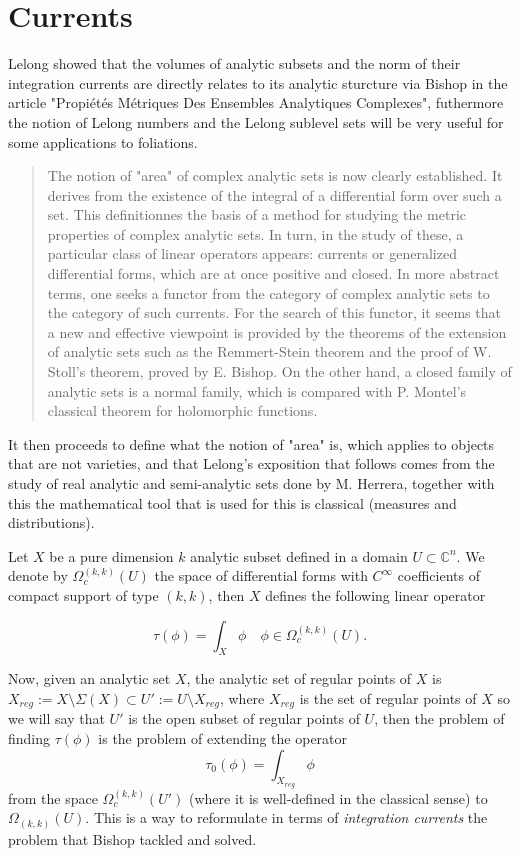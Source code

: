 \documentclass[12pt,twoside,a4paper]{report}
\newcommand{\om}{\ensuremath{\Omega}}
\newcommand{\sig}{\ensuremath{\Sigma}}
\begin{document}
\chapter{Currents}
\pagestyle{fancy}
\fancyhf{}
\fancyhead[LE]{\rightmark}
\fancyhead[RO]{\leftmark}
\fancyfoot[C]{\thepage}
\noindent Lelong showed that the volumes of analytic subsets and the norm of their integration currents are directly relates to its analytic sturcture via Bishop in the article "Propiétés Métriques Des Ensembles Analytiques Complexes", futhermore the notion of Lelong numbers and the Lelong sublevel sets will be very useful for some applications to foliations.
\begin{quote}
The notion of "area" of complex analytic sets is now clearly established. It derives from the existence of the integral of a differential form over such a set. This definitionnes the basis of a method for studying the metric properties of complex analytic sets. In turn, in the study of these, a particular class of linear operators appears: currents or generalized differential forms, which are at once positive and closed. In more abstract terms, one seeks a functor from the category of complex analytic sets to the category of such currents. For the search of this functor, it seems that a new and effective viewpoint is provided by the theorems of the extension of analytic sets such as the Remmert-Stein theorem and the proof of W. Stoll's theorem, proved by E. Bishop. On the other hand, a closed family of analytic sets is a normal family, which is compared with P. Montel's classical theorem for holomorphic functions.
\end{quote}

\noindent It then proceeds to define what the notion of "area" is, which applies to objects that are not varieties, and that Lelong's exposition that follows comes from the study of real analytic and semi-analytic sets done by M. Herrera, together with this the mathematical tool that is used for this is classical (measures and distributions).

Let $X$ be a pure dimension $k$ analytic subset defined in a domain $U\subset\mathbb{C}^n$. We denote by $\om^{(k,k)}_c(U)$ the space of differential forms with $C^{\infty}$ coefficients of compact support of type $(k,k)$, then $X$ defines the following linear operator

\[
    \tau(\phi)=\int_{X}\phi\quad\phi\in\om^{(k,k)}_c(U).
\]

Now, given an analytic set $X$, the analytic set of regular points of $X$ is $X_{reg}:=X\setminus \sig(X)\subset U':=U\setminus X_{reg}$, where $X_{reg}$ is the set of regular points of $X$ so we will say that $U'$ is the open subset of regular points of $U$, then the problem of finding $\tau(\phi)$ is the problem of extending the operator
\[
    \tau_0(\phi)=\int_{X_{reg}}\phi
\]
from the space $\om^{(k,k)}_c(U')$ (where it is well-defined in the classical sense) to $\om_{(k,k)}(U)$. This is a way to reformulate in terms of \emph{integration currents} the problem that Bishop tackled and solved.
\end{document}
